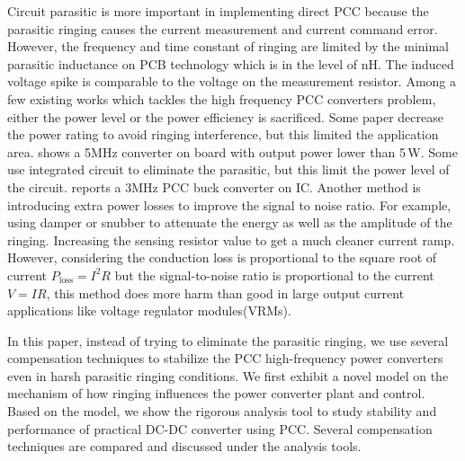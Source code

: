 Circuit parasitic is more important in implementing direct PCC because the parasitic ringing causes the current measurement and current command error. However, the frequency and time constant of ringing are limited by the minimal parasitic inductance on PCB technology which is in the level of nH. The induced voltage spike is comparable to the voltage on the measurement resistor. Among a few existing works which tackles the high frequency PCC converters problem, either the power level or the power efficiency is sacrificed. Some paper decrease the power rating to avoid ringing interference, but this limited the application area. \cite{Huerta2012} shows a 5MHz converter on board with output power lower than 5\,W. Some use integrated circuit to eliminate the parasitic, but this limit the power level of the circuit. \cite{Trescases2011} reports a 3MHz PCC buck converter on IC. Another method is introducing extra power losses to improve the signal to noise ratio. For example, using damper or snubber to attenuate the energy as well as the amplitude of the ringing. Increasing the sensing resistor value to get a much cleaner current ramp. However, considering the conduction loss is proportional to the square root of current $P_{\text{loss}} = I^2R$ but the signal-to-noise ratio is proportional to the current $V = IR$, this method does more harm than good in large output current applications like voltage regulator modules(VRMs). 

In this paper, instead of trying to eliminate the parasitic ringing, we use several compensation techniques to stabilize the PCC high-frequency power converters even in harsh parasitic ringing conditions. We first exhibit a novel model on the mechanism of how ringing influences the power converter plant and control. Based on the model, we show the rigorous analysis tool to study stability and performance of practical DC-DC converter using PCC. Several compensation techniques are compared and discussed under the analysis tools.

